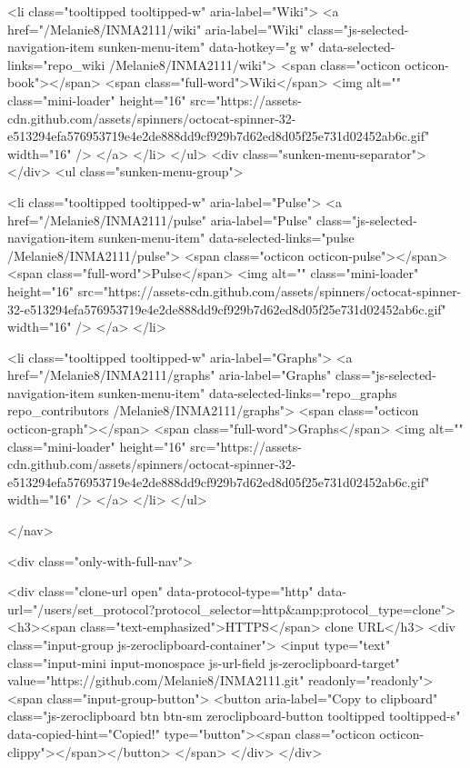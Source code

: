       <li class="tooltipped tooltipped-w" aria-label="Wiki">
        <a href="/Melanie8/INMA2111/wiki" aria-label="Wiki" class="js-selected-navigation-item sunken-menu-item" data-hotkey="g w" data-selected-links="repo_wiki /Melanie8/INMA2111/wiki">
          <span class="octicon octicon-book"></span> <span class="full-word">Wiki</span>
          <img alt="" class="mini-loader" height="16" src="https://assets-cdn.github.com/assets/spinners/octocat-spinner-32-e513294efa576953719e4e2de888dd9cf929b7d62ed8d05f25e731d02452ab6c.gif" width="16" />
</a>      </li>
  </ul>
  <div class="sunken-menu-separator"></div>
  <ul class="sunken-menu-group">

    <li class="tooltipped tooltipped-w" aria-label="Pulse">
      <a href="/Melanie8/INMA2111/pulse" aria-label="Pulse" class="js-selected-navigation-item sunken-menu-item" data-selected-links="pulse /Melanie8/INMA2111/pulse">
        <span class="octicon octicon-pulse"></span> <span class="full-word">Pulse</span>
        <img alt="" class="mini-loader" height="16" src="https://assets-cdn.github.com/assets/spinners/octocat-spinner-32-e513294efa576953719e4e2de888dd9cf929b7d62ed8d05f25e731d02452ab6c.gif" width="16" />
</a>    </li>

    <li class="tooltipped tooltipped-w" aria-label="Graphs">
      <a href="/Melanie8/INMA2111/graphs" aria-label="Graphs" class="js-selected-navigation-item sunken-menu-item" data-selected-links="repo_graphs repo_contributors /Melanie8/INMA2111/graphs">
        <span class="octicon octicon-graph"></span> <span class="full-word">Graphs</span>
        <img alt="" class="mini-loader" height="16" src="https://assets-cdn.github.com/assets/spinners/octocat-spinner-32-e513294efa576953719e4e2de888dd9cf929b7d62ed8d05f25e731d02452ab6c.gif" width="16" />
</a>    </li>
  </ul>


</nav>

              <div class="only-with-full-nav">
                  
<div class="clone-url open"
  data-protocol-type="http"
  data-url="/users/set_protocol?protocol_selector=http&amp;protocol_type=clone">
  <h3><span class="text-emphasized">HTTPS</span> clone URL</h3>
  <div class="input-group js-zeroclipboard-container">
    <input type="text" class="input-mini input-monospace js-url-field js-zeroclipboard-target"
           value="https://github.com/Melanie8/INMA2111.git" readonly="readonly">
    <span class="input-group-button">
      <button aria-label="Copy to clipboard" class="js-zeroclipboard btn btn-sm zeroclipboard-button tooltipped tooltipped-s" data-copied-hint="Copied!" type="button"><span class="octicon octicon-clippy"></span></button>
    </span>
  </div>
</div>

